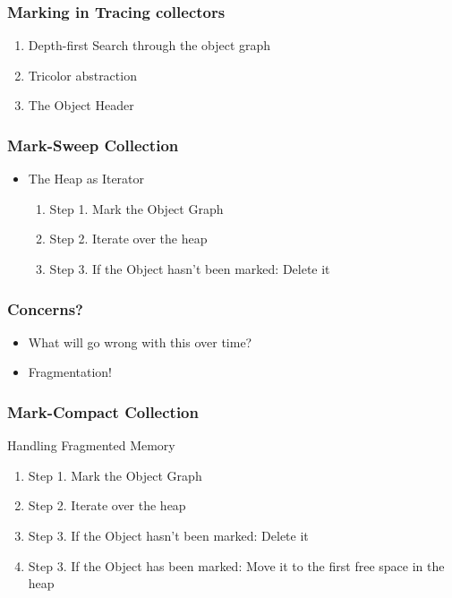 \documentclass{beamer}
\begin{document}
\begin{frame}
  \frametitle{Marking in Tracing collectors}
  \begin{enumerate}
    \item Depth-first Search through the object graph
    \item Tricolor abstraction
    \item The Object Header
  \end{enumerate}
\end{frame}

\begin{frame}
  \frametitle{Mark-Sweep Collection}
  \begin{itemize}
    \item The Heap as Iterator
    \begin{enumerate}
      \item Step 1. Mark the Object Graph
      \item Step 2. Iterate over the heap
      \item Step 3. If the Object hasn't been marked: Delete it
    \end{enumerate}
  \end{itemize}
\end{frame}

\begin{frame}
  \frametitle{Concerns?}
  \begin{itemize}
    \item What will go wrong with this over time?
    \pause{}
    \item Fragmentation!
  \end{itemize}
\end{frame}

\begin{frame}
  \frametitle{Mark-Compact Collection}
  \begin{heading}
    Handling Fragmented Memory
  \end{heading}

  \begin{enumerate}
    \item Step 1. Mark the Object Graph
    \item Step 2. Iterate over the heap
    \item Step 3. If the Object hasn't been marked: Delete it
    \item Step 3. If the Object has    been marked: Move it to the first free space in the heap
  \end{enumerate}
\end{frame}
\end{document}
